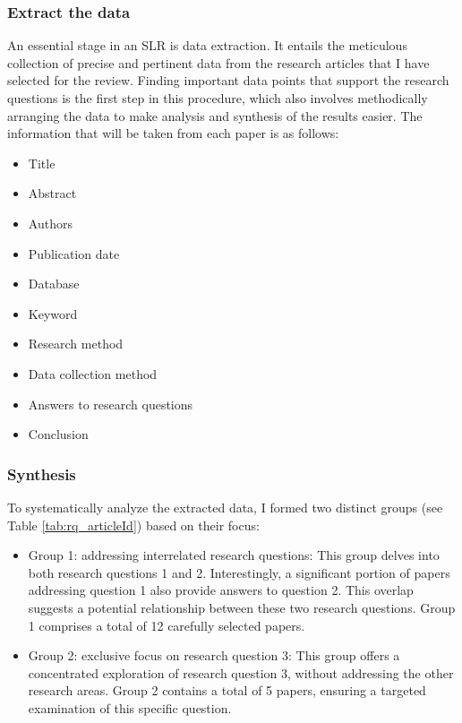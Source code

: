 \subsubsection{Extract the data}
An essential stage in an SLR is data extraction. It entails the meticulous collection of precise and pertinent data from the research articles that I have selected for the review. Finding important data points that support the research questions is the first step in this procedure, which also involves methodically arranging the data to make analysis and synthesis of the results easier.
The information that will be taken from each paper is as follows:
\begin{itemize}
    \item Title
    \item Abstract
    \item Authors
    \item Publication date
    \item Database
    \item Keyword
    \item Research method
    \item Data collection method
    \item Answers to research questions
    \item Conclusion
\end{itemize}

\subsubsection{Synthesis}

To systematically analyze the extracted data, I formed two distinct groups (see Table \ref{tab:rq_articleId}) based on their focus:

\begin{itemize}
    \item Group 1: addressing interrelated research questions: This group delves into both research questions 1 and 2. Interestingly, a significant portion of papers addressing question 1 also provide answers to question 2. This overlap suggests a potential relationship between these two research questions. Group 1 comprises a total of 12 carefully selected papers.
    \item Group 2: exclusive focus on research question 3: This group offers a concentrated exploration of research question 3, without addressing the other research areas. Group 2 contains a total of 5 papers, ensuring a targeted examination of this specific question.
\end{itemize}


